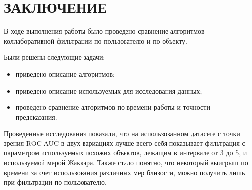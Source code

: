 \section*{ЗАКЛЮЧЕНИЕ}
В ходе выполнения работы было проведено сравнение алгоритмов коллаборативной фильтрации по пользователю и по объекту.

Были решены следующие задачи:
\begin{itemize}
	\item приведено описание алгоритмов;
	\item приведено описание используемых для исследования данных;
	\item проведено сравнение алгоритмов по времени работы и точности предсказания.
\end{itemize}

Проведенные исследования показали, что на использованном датасете с точки зрения ROC-AUC в двух вариациях лучше всего себя показывает фильтрация с параметром используемых похожих объектов, лежащим в интервале от 3 до 5, и используемой мерой Жаккара. Также стало понятно, что некоторый выигрыш по времени за счет использования различных мер близости, можно получить лишь при фильтрации по пользователю.

\pagebreak